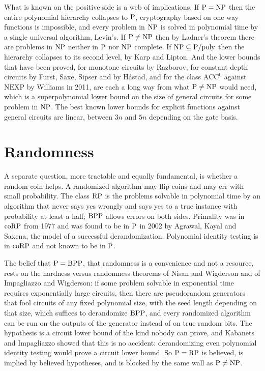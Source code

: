 What is known on the positive side is a web of implications. If $\mathrm{P} = \mathrm{NP}$ then the entire polynomial hierarchy collapses to $\mathrm{P}$, cryptography based on one way functions is impossible, and every problem in $\mathrm{NP}$ is solved in polynomial time by a single universal algorithm, Levin's. If $\mathrm{P} \neq \mathrm{NP}$ then by Ladner's theorem there are problems in $\mathrm{NP}$ neither in $\mathrm{P}$ nor $\mathrm{NP}$ complete. If $\mathrm{NP} \subseteq \mathrm{P}/\mathrm{poly}$ then the hierarchy collapses to its second level, by Karp and Lipton. And the lower bounds that have been proved, for monotone circuits by Razborov, for constant depth circuits by Furst, Saxe, Sipser and by H{\aa}stad, and for the class $\mathrm{ACC}^0$ against $\mathrm{NEXP}$ by Williams in 2011, are each a long way from what $\mathrm{P} \neq \mathrm{NP}$ would need, which is a superpolynomial lower bound on the size of general circuits for some problem in $\mathrm{NP}$. The best known lower bounds for explicit functions against general circuits are linear, between $3n$ and $5n$ depending on the gate basis.

\section{Randomness}

A separate question, more tractable and equally fundamental, is whether a random coin helps. A randomized algorithm may flip coins and may err with small probability. The class $\mathrm{RP}$ is the problems solvable in polynomial time by an algorithm that never says yes wrongly and says yes to a true instance with probability at least a half; $\mathrm{BPP}$ allows errors on both sides. Primality was in $\mathrm{coRP}$ from 1977 and was found to be in $\mathrm{P}$ in 2002 by Agrawal, Kayal and Saxena, the model of a successful derandomization. Polynomial identity testing is in $\mathrm{coRP}$ and not known to be in $\mathrm{P}$.

The belief that $\mathrm{P} = \mathrm{BPP}$, that randomness is a convenience and not a resource, rests on the hardness versus randomness theorems of Nisan and Wigderson and of Impagliazzo and Wigderson: if some problem solvable in exponential time requires exponentially large circuits, then there are pseudorandom generators that fool circuits of any fixed polynomial size, with the seed length depending on that size, which suffices to derandomize $\mathrm{BPP}$, and every randomized algorithm can be run on the outputs of the generator instead of on true random bits. The hypothesis is a circuit lower bound of the kind nobody can prove, and Kabanets and Impagliazzo showed that this is no accident: derandomizing even polynomial identity testing would prove a circuit lower bound. So $\mathrm{P} = \mathrm{RP}$ is believed, is implied by believed hypotheses, and is blocked by the same wall as $\mathrm{P} \neq \mathrm{NP}$.

